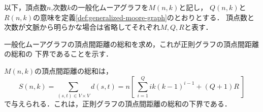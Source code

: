 以下，頂点数$n$,次数$k$の一般化ムーアグラフを$M(n,k)$と記し，
$Q(n,k)$と$R(n,k)$の意味を定義\ref{def:generalized-moore-graph}のとおりとする．
頂点数と次数が文脈から明らかな場合は省略してそれぞれ$M,Q,R$と表す．

一般化ムーアグラフの頂点間距離の総和を求め，これが正則グラフの頂点間距離の総和の
下界であることを示す．
\begin{theorem}
  \label{theorem:gmg-lower-bound}
  $M(n,k)$の頂点間距離の総和は，
  \begin{equation}
    \label{eq:gmg-lb}
    S(n,k) = \sum_{(s,t)\in V\times V}d(s,t) =
    n \left[\ \sum^{Q}_{i=1}ik(k-1)^{i-1} + (Q+1)R\ \right]
  \end{equation}
  で与えられる．これは，正則グラフの頂点間距離の総和の下界である．
\end{theorem}
